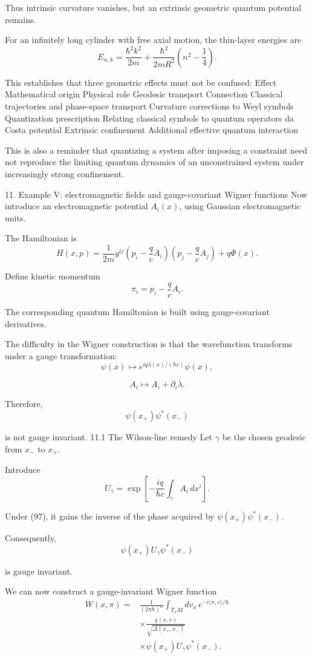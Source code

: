 Thus intrinsic curvature vanishes, but an extrinsic geometric quantum potential remains.

For an infinitely long cylinder with free axial motion, the thin-layer energies are
\[
E_{n,k}=
\frac{\hbar^2k^2}{2m}
+
\frac{\hbar^2}{2mR^2}
\left(n^2-\frac14\right).
\tag{94}
\]

This establishes that three geometric effects must not be confused:
Effect	Mathematical origin	Physical role
Geodesic transport	Connection	Classical trajectories and phase-space transport
Curvature corrections to Weyl symbols	Quantization prescription	Relating classical symbols to quantum operators
da Costa potential	Extrinsic confinement	Additional effective quantum interaction

This is also a reminder that quantizing a system after imposing a constraint need not reproduce the limiting quantum dynamics of an unconstrained system under increasingly strong confinement.

11. Example V: electromagnetic fields and gauge-covariant Wigner functions
Now introduce an electromagnetic potential \(A_i(x)\), using Gaussian electromagnetic units.

The Hamiltonian is
\[
H(x,p)=
\frac1{2m}g^{ij}
\left(p_i-\frac qcA_i\right)
\left(p_j-\frac qcA_j\right)
+q\Phi(x).
\tag{95}
\]

Define kinetic momentum
\[
\pi_i=p_i-\frac qcA_i.
\tag{96}
\]

The corresponding quantum Hamiltonian is built using gauge-covariant derivatives.

The difficulty in the Wigner construction is that the wavefunction transforms under a gauge transformation:
\[
\psi(x)\longmapsto
e^{iq\lambda(x)/(\hbar c)}\psi(x),
\]

\[
A_i\longmapsto A_i+\partial_i\lambda.
\tag{97}
\]

Therefore,
\[
\psi(x_+)\psi^*(x_-)
\]

is not gauge invariant.
11.1 The Wilson-line remedy
Let \(\gamma\) be the chosen geodesic from \(x_-\) to \(x_+\).

Introduce
\[
U_\gamma=
\exp\left[
-\frac{iq}{\hbar c}
\int_\gamma A_i\,dx^i
\right].
\tag{98}
\]

Under (97), it gains the inverse of the phase acquired by \(\psi(x_+)\psi^*(x_-)\).

Consequently,
\[
\psi(x_+)U_\gamma\psi^*(x_-)
\tag{99}
\]

is gauge invariant.

We can now construct a gauge-invariant Wigner function
\[
\boxed{
\begin{aligned}
W(x,\pi)
={}&
\frac1{(2\pi\hbar)^n}
\int_{T_xM}dv_x\,
e^{-i\langle\pi,v\rangle/\hbar}\\
&\times
\frac{\chi(x,v)}
{\sqrt{\Delta(x_+,x_-)}}\\
&\times
\psi(x_+)U_\gamma\psi^*(x_-).
\end{aligned}
}
\tag{100}
\]


